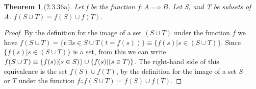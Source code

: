\documentclass[a4paper, 12pt]{article}
\theoremstyle{plain}
\newtheorem*{theorem*}{Theorem}
\begin{document}
	
	\begin{theorem*}[2.3.36a]
		Let f be the function $f: A \implies B$. Let S, and T be subsets of A. $f(S \cup T) = f(S) \cup f(T)$.
	\end{theorem*}
	
	\begin{proof}
		By the definition for the image of a set $(S \cup T)$ under the function $f$ we have $f(S \cup T) = \{t | \exists s \in S \cup T (t = f(s))\} \equiv \{f(s) | s \in (S \cup T)\}$. Since $\{f(s) | s \in (S \cup T)\}$ is a set, from this we can write $f(S \cup T) \equiv \newline \{f(s) | (s \in S)\} \cup \{f(s) | (s \in T)\}$. The right-hand side of this equivalence is the set $f(S) \cup f(T)$, by the definition for the image of a set $S$ or $T$ under the function $f \therefore f(S \cup T) = f(S) \cup f(T)$.
		
	\end{proof}
\end{document}
